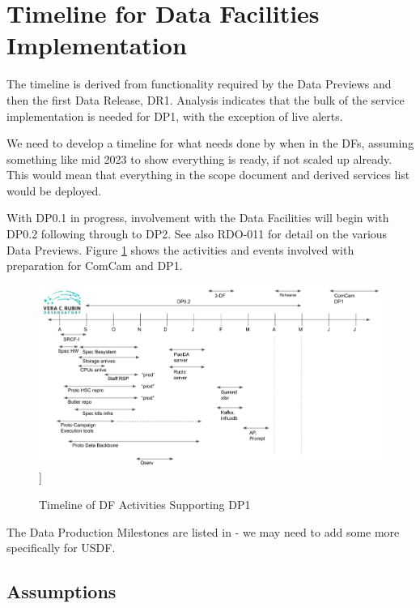 
\section{Timeline for Data Facilities Implementation}\label{sec:timeline}

The timeline is derived from functionality required by the Data
Previews and then the first Data \gls{Release}, DR1. Analysis indicates that
the bulk of the service implementation is needed for \gls{DP1}, with the
exception of live alerts.

We need to develop a timeline for what needs done by when in the DFs, assuming something like mid 2023 to show everything is ready, if not scaled up already.
This would mean that everything in the scope document and derived services list would be deployed.

With \gls{DP0}.1 in progress, involvement with the Data Facilities will
begin with \gls{DP0}.2  following through to \gls{DP2}.
See also \gls{RDO}-011 for detail on the various Data Previews. Figure
\ref{timeline} shows the activities and events involved with
preparation for ComCam and DP1.

\begin{figure}
\includegraphics[width=\textwidth]{USDF-DP1_Timeline.jpg}]
\caption{Timeline of DF Activities Supporting DP1 }
\label{timeline}
\end{figure}

The Data Production Milestones are listed in  - we may need to add some more specifically for \gls{USDF}.


\subsection{Assumptions}

